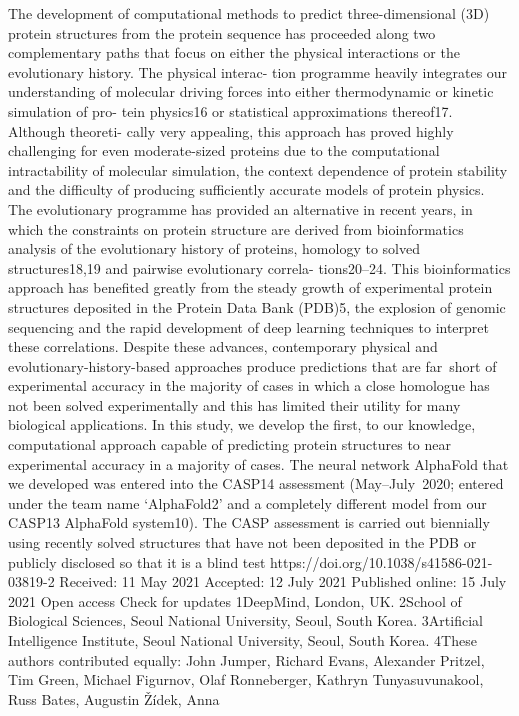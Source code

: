 The development of computational methods to predict
three-dimensional (3D) protein structures from the protein sequence
has proceeded along two complementary paths that focus on either the
physical interactions or the evolutionary history. The physical interac-
tion programme heavily integrates our understanding of molecular
driving forces into either thermodynamic or kinetic simulation of pro-
tein physics16 or statistical approximations thereof17. Although theoreti-
cally very appealing, this approach has proved highly challenging for
even moderate-sized proteins due to the computational intractability
of molecular simulation, the context dependence of protein stability
and the difficulty of producing sufficiently accurate models of protein
physics. The evolutionary programme has provided an alternative in
recent years, in which the constraints on protein structure are derived
from bioinformatics analysis of the evolutionary history of proteins,
homology to solved structures18,19 and pairwise evolutionary correla-
tions20–24. This bioinformatics approach has benefited greatly from
the steady growth of experimental protein structures deposited in
the Protein Data Bank (PDB)5, the explosion of genomic sequencing
and the rapid development of deep learning techniques to interpret
these correlations. Despite these advances, contemporary physical
and evolutionary-history-based approaches produce predictions that
are far short of experimental accuracy in the majority of cases in which
a close homologue has not been solved experimentally and this has
limited their utility for many biological applications.
In this study, we develop the first, to our knowledge, computational
approach capable of predicting protein structures to near experimental
accuracy in a majority of cases. The neural network AlphaFold that we
developed was entered into the CASP14 assessment (May–July 2020;
entered under the team name ‘AlphaFold2’ and a completely different
model from our CASP13 AlphaFold system10). The CASP assessment is
carried out biennially using recently solved structures that have not
been deposited in the PDB or publicly disclosed so that it is a blind test
https://doi.org/10.1038/s41586-021-03819-2
Received: 11 May 2021
Accepted: 12 July 2021
Published online: 15 July 2021
Open access
 Check for updates
1DeepMind, London, UK. 2School of Biological Sciences, Seoul National University, Seoul, South Korea. 3Artificial Intelligence Institute, Seoul National University, Seoul, South Korea. 4These
authors contributed equally: John Jumper, Richard Evans, Alexander Pritzel, Tim Green, Michael Figurnov, Olaf Ronneberger, Kathryn Tunyasuvunakool, Russ Bates, Augustin Žídek, Anna
